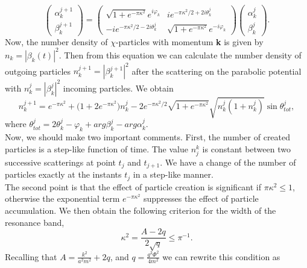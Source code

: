 \documentclass[11pt,a4paper,twoside]{book}
\begin{document}
\begin{equation}
	\label{Chap4:scatteringMatrix2}
		\left(
	\begin{array}{c}
		\alpha_{k}^{j+1} \\
		\beta_{k}^{j+1}
	\end{array}
	\right)
	=
	\left(
	\begin{array}{cc}
		\sqrt{1+e^{-\pi \kappa^{2}}}e^{i\varphi_{k}}  & ie^{-\pi \kappa^{2}/2 + 2i\theta^{j}_{k}} \\
		-ie^{-\pi \kappa^{2}/2 - 2i\theta^{j}_{k}} & \sqrt{1+e^{-\pi \kappa^{2}}} e^{-i\varphi_{k}}
	\end{array}
	\right)
	\left(
	\begin{array}{c}
		\alpha_{k}^{j}	\\
		\beta_{k}^{j}
	\end{array}
	\right).
\end{equation}
Now, the number density of $\chi$-particles with momentum \textbf{k} is given by $ n_{k} = |\beta_{k}(t)|^{2} $. Then from this equation we can calculate the number density of outgoing particles $ n_{k}^{j+1}=|\beta_{k}^{j+1}|^{2} $ after the scattering on the parabolic potential with $ n_{k}^{j}=|\beta_{k}^{j}|^{2} $ incoming particles. We obtain
\begin{equation}
\label{Chap4:parabolicPotentialParticles}
n_{k}^{j+1}=e^{-\pi \kappa^{2}} + \Bigg(1+2e^{-\pi \kappa^{2}}\Bigg)n^{j}_{k} - 2e^{-\pi \kappa^{2}/2}\sqrt{1+e^{-\pi \kappa^{2}}}\sqrt{n_{k}^{j}(1+n_{k}^{j})}\sin \theta^{j}_{tot},
\end{equation}
where $ \theta^{j}_{tot}=2\theta^{j}_{k} - \varphi_{k} + arg \beta_{k}^{j} - arg \alpha_{k}^{j} $. \\
Now, we should make two important comments. First, the number of created particles is a step-like function of time. The value $ n_{j}^{k} $ is  constant between two successive scatterings at point $ t_{j} $ and $ t_{j+1} $. We have a change of the number of particles exactly at the instants $ t_{j} $ in a step-like manner.\\
The second point is that the effect of particle creation is significant if $ \pi \kappa^{2} \le 1 $, otherwise the exponential term $ e^{-\pi\kappa^{2}} $ suppresses the effect of particle accumulation. We then obtain the following criterion for the width of the resonance band,
\begin{equation}
\label{Chap4:constraintResonanceBand}
\kappa^{2} = \frac{A-2q}{2\sqrt{q}} \le \pi^{-1}.
\end{equation}
Recalling that $ A=\frac{k^{2}}{a^{2}m^{2}} + 2q $, and $ q=\frac{g^{2}\Phi^{2}}{4m^{2}} $ we can rewrite this condition as
\end{document}
